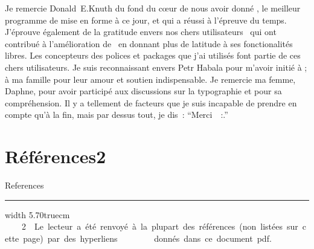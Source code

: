 \bs

\ii Je remercie Donald~E.\;Knuth du fond du c\oe ur de nous avoir donn\'e \capstex, le meilleur programme de mise en forme \`a ce jour, et qui a r\'eussi \`a l'\'epreuve du temps.  J'\'eprouve \'egalement de la gratitude envers nos chers utilisateurs \capstex\ qui ont contribu\'e \`a l'am\'elioration de \capstex\ en donnant plus de latitude \`a ses fonctionalit\'es libres. Les concepteurs des polices et packages que j'ai utilis\'es font partie de ces chers utilisateurs. Je suis reconnaissant envers Petr Habala pour m'avoir initi\'e \`a \capstex; \`a ma famille pour leur amour et soutien indispensable. Je remercie ma femme, Daphne, pour avoir particip\'e aux discussions sur la typographie et pour sa compr\'ehension. Il y a tellement de facteurs que je suis incapable de prendre en compte qu'\`a la fin, mais par dessus tout, je dis~: ``Merci~{\dev~:}.''











\section{R\'ef\'erences\hbox{\bf 2}}{References}

\nocite{habala_amstex}\nocite{knuth_texbook}\nocite{fonts_tex_latex}\nocite{elements_typographic}






\vskip7.5cm\hrule width 5.70truecm\kern2mm\eightrm\fontss
\hbox{ \hbox{\ \ \ 2}\ \;  Le lecteur a \'et\'e renvoy\'e \`a la plupart des r\'ef\'erences (non list\'ees sur cette page) par des hyperliens}
\hbox{\ \ \ \ \ \ \ \ donn\'es dans ce document {\caps pdf}.}





































\bye







